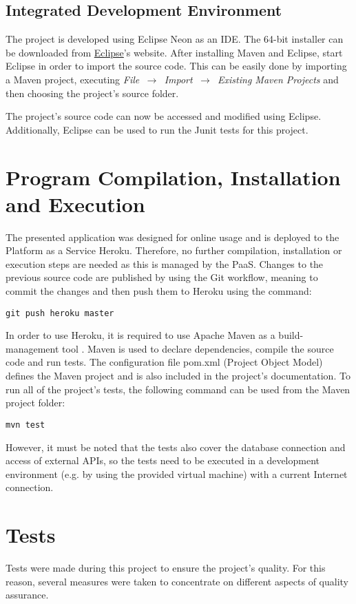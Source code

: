 \subsection{Integrated Development Environment}
The project is developed using Eclipse Neon as an IDE. The 64-bit installer can be downloaded from \hyperlink{https://www.eclipse.org/downloads/}{Eclipse}'s website. 
After installing Maven and Eclipse, start Eclipse in order to import the source code. This can be easily done by importing a Maven project, executing \textit{File $\,\to\,$ Import $\,\to\,$ Existing Maven Projects} and then choosing the project's source folder.
 
The project’s source code can now be accessed and modified using Eclipse. Additionally, Eclipse can be used to run the Junit tests for this project.

\section{Program Compilation, Installation and Execution}
The presented application was designed for online usage and is deployed to the Platform as a Service Heroku.  Therefore, no further compilation, installation or execution steps are needed as this is managed by the PaaS. Changes to the previous source code are published by using the Git workflow, meaning to commit the changes and then push them to Heroku using the command:
\begin{lstlisting}
git push heroku master
\end{lstlisting}

In order to use Heroku, it is required to use Apache Maven as a build-management tool \cite{maven}. Maven is used to declare dependencies, compile the source code and run tests. The configuration file pom.xml (Project Object Model) defines the Maven project and is also included in the project’s documentation. To run all of the project’s tests, the following command can be used from the Maven project folder:

\begin{lstlisting}
mvn test
\end{lstlisting}

However, it must be noted that the tests also cover the database connection and access of external APIs, so the tests need to be executed in a development environment (e.g. by using the provided virtual machine) with a current Internet connection.

\section{Tests}
Tests were made during this project to ensure the project’s quality. For this reason, several measures were taken to concentrate on different aspects of quality assurance. 

